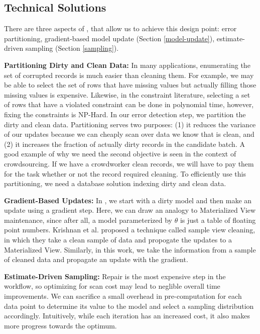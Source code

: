 \subsection{Technical Solutions}
There are three aspects of \sys, that allow us to achieve this design point: error partitioning, gradient-based model update (Section \ref{model-update}), estimate-driven sampling (Section \ref{sampling}).

\vspace{0.5em}

\noindent\textbf{Partitioning Dirty and Clean Data: } In many applications, enumerating the set of corrupted records is much easier than cleaning them. For example, we may be able to select the set of rows that have missing values but actually filling those missing values is expensive. Likewise, in the constraint literature, selecting a set of rows that have a violated constraint can be done in polynomial time, however, fixing the constraints is NP-Hard.
In our error detection step, we partition the dirty and clean data.
Partitioning serves two purposes: (1) it reduces the variance of our updates because we can cheaply scan over data we know that is clean, and (2) it increases the fraction of actually dirty records in the candidate batch.
A good example of why we need the second objective is seen in the context of crowdsourcing.
If we have a crowdworker clean records, we will have to pay them for the task whether or not the record required cleaning.
To efficiently use this partitioning, we need a database solution indexing dirty and clean data.

\vspace{0.5em}

\noindent\textbf{Gradient-Based Updates: } In \sys, we start with a dirty model and then make an update using a gradient step. Here, we can draw an analogy to Materialized View maintenance, since after all, a model parameterized by $\theta$ is just a table of floating point numbers.
Krishnan et al. proposed a technique called sample view cleaning, in which they take a clean sample of data and propogate the updates to a Materialized View.
Similarly, in this work, we take the information from a sample of cleaned data and propagate an update with the gradient.

\vspace{0.5em}

\noindent\textbf{Estimate-Driven Sampling: } Repair is the most expensive step in the workflow, so optimizing for scan cost may lead to neglible overall time improvements.
We can sacrifice a small overhead in pre-computation for each data point to determine its value to the model and select a sampling distribution accordingly.
Intuitively, while each iteration has an increased cost, it also makes more progress towards the optimum.


